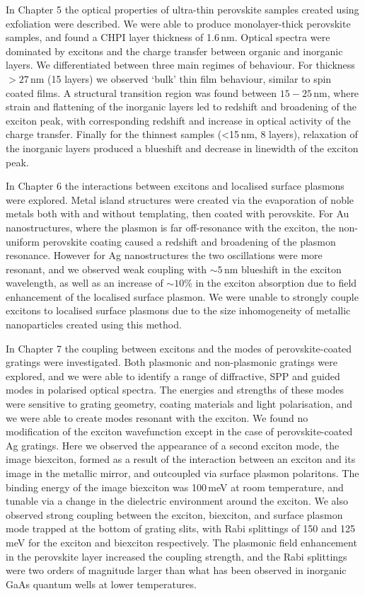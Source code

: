 In Chapter 5 the optical properties of ultra-thin perovskite samples created using exfoliation were described. We were able to produce monolayer-thick perovskite samples, and found a CHPI layer thickness of 1.6\,nm. Optical spectra were dominated by excitons and the charge transfer between organic and inorganic layers. We differentiated between three main regimes of behaviour. For thickness $>27$\,nm (15 layers) we observed `bulk' thin film behaviour, similar to spin coated films. A structural transition region was found between $15-25$\,nm, where strain and flattening of the inorganic layers led to redshift and broadening of the exciton peak, with corresponding redshift and increase in optical activity of the charge transfer. Finally for the thinnest samples (<15\,nm, 8 layers), relaxation of the inorganic layers produced a blueshift and decrease in linewidth of the exciton peak.

In Chapter 6 the interactions between excitons and localised surface plasmons were explored. Metal island structures were created via the evaporation of noble metals both with and without templating, then coated with perovskite. For Au nanostructures, where the plasmon is far off-resonance with the exciton, the non-uniform perovskite coating caused a redshift and broadening of the plasmon resonance. However for Ag nanostructures the two oscillations were more resonant, and we observed weak coupling with $\sim 5$\,nm blueshift in the exciton wavelength, as well as an increase of $\sim 10$\% in the exciton absorption due to field enhancement of the localised surface plasmon. We were unable to strongly couple excitons to localised surface plasmons due to the size inhomogeneity of metallic nanoparticles created using this method.

In Chapter 7 the coupling between excitons and the modes of perovskite-coated gratings were investigated. Both plasmonic and non-plasmonic gratings were explored, and we were able to identify a range of diffractive, SPP and guided modes in polarised optical spectra. The energies and strengths of these modes were sensitive to grating geometry, coating materials and light polarisation, and we were able to create modes resonant with the exciton. We found no modification of the exciton wavefunction except in the case of perovskite-coated Ag gratings. Here we observed the appearance of a second exciton mode, the image biexciton, formed as a result of the interaction between an exciton and its image in the metallic mirror, and outcoupled via surface plasmon polaritons. The binding energy of the image biexciton was 100\,meV at room temperature, and tunable via a change in the dielectric environment around the exciton. We also observed strong coupling between the exciton, biexciton, and surface plasmon mode trapped at the bottom of grating slits, with Rabi splittings of 150 and 125\,meV for the exciton and biexciton respectively. The plasmonic field enhancement in the perovskite layer increased the coupling strength, and the Rabi splittings were two orders of magnitude larger than what has been observed in inorganic GaAs quantum wells at lower temperatures.

